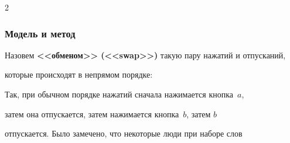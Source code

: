 \begin{multicols}{2}
\vspace*{-2pt}



\subsubsection{Модель и метод}



Назовем {\bf <<обменом>> (<<swap>>)} такую па\-ру нажатий и отпусканий, 

которые происходят в непрямом порядке:



\vspace*{-18pt}




    

    \vspace*{6pt}

    

\noindent

Так, при обычном порядке нажатий сначала нажимается кнопка~$a$,

затем она отпускается, затем нажимается кнопка~$b$, затем $b$

отпускается. Было замечено, что некоторые люди при наборе слов


\end{multicols}
